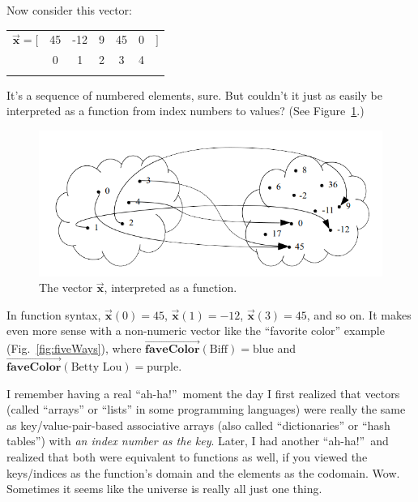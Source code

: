 Now consider this vector:

\begin{center}
\begin{tabular}{ccccccc}
$\overrightarrow{\textbf{x}} = [$ & 45 & -12 & 9 & 45 & 0 & $]$ \\
& \scriptsize{0} & \scriptsize{1} & \scriptsize{2} & \scriptsize{3} & \scriptsize{4}& \\
\normalsize
\end{tabular}
\end{center}
\vspace{-.15in}

It's a sequence of numbered elements, sure. But couldn't it just as easily be
interpreted as a function from index numbers to values? (See
Figure~\ref{vectorFunction1}.)

\begin{figure}[ht]
\centering
\includegraphics[width=1\textwidth]{vectorFunction1.png}
\caption[.]{The vector $\overrightarrow{\textbf{x}}$, interpreted as a function.}
\label{vectorFunction1}
\end{figure}

In function syntax, $\overrightarrow{\textbf{x}}(0) = 45$,
$\overrightarrow{\textbf{x}}(1) = -12$, $\overrightarrow{\textbf{x}}(3) = 45$,
and so on. It makes even more sense with a non-numeric vector like the
``favorite color'' example (Fig.~\ref{fig:fiveWays}), where 
$\overrightarrow{\textbf{faveColor}}(\textrm{Biff}) = \textrm{blue}$ and
$\overrightarrow{\textbf{faveColor}}(\textrm{Betty Lou}) = \textrm{purple}$.


I remember having a real ``ah-ha!''~moment the day I first realized that
vectors (called ``arrays'' or ``lists'' in some programming languages) were
really the same as key/value-pair-based associative arrays (also called
``dictionaries'' or ``hash tables'') with \textit{an index number as the key}.
Later, I had another ``ah-ha!''~and realized that both were equivalent to
functions as well, if you viewed the keys/indices as the function's domain and
the elements as the codomain. Wow. Sometimes it seems like the universe is
really all just one thing.


